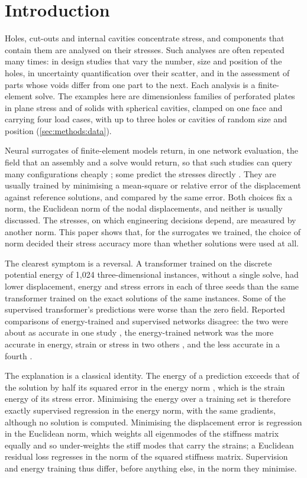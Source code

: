 \section{Introduction}\label{sec:intro}

Holes, cut-outs and internal cavities concentrate stress, and components that contain them are
analysed on their stresses. Such analyses are often repeated many times: in design studies
that vary the number, size and position of the holes, in uncertainty quantification over their
scatter, and in the assessment of parts whose voids differ from one part to the next. Each analysis
is a finite-element solve. The examples here are dimensionless families of perforated plates
in plane stress and of solids with spherical cavities, clamped on one face and carrying four
load cases, with up to three holes or cavities of random size and position
(\cref{sec:methods:data}).

Neural surrogates of finite-element models return, in one network evaluation, the field that
an assembly and a solve would return, so that such studies can query many configurations
cheaply
\cite{Pfaff2021,Lu2021DeepONet,Li2021FNO,He2024GeomDeepONet,Zeng2025PCNO,Liu2026GINOT,Deshpande2024MAgNET};
some predict the stresses directly \cite{JiangChen2023GNN}. They
are usually trained by minimising a mean-square or relative error of the displacement
against reference solutions, and compared by the same error. Both choices fix a norm, the
Euclidean norm of the nodal displacements, and neither is usually discussed. The stresses,
on which engineering decisions depend, are measured by another norm. This paper shows that,
for the surrogates we trained, the choice of norm decided their stress accuracy more than
whether solutions were used at all.

The clearest symptom is a reversal. A transformer trained on the discrete potential energy
of 1,024 three-dimensional instances, without a single solve, had lower displacement, energy
and stress errors in each of three seeds than the same transformer trained on the exact
solutions of the same instances. Some of the supervised transformer's predictions were worse
than the zero field.
Reported comparisons of energy-trained and supervised networks disagree: the two were about
as accurate in one study \cite{Zhu2019}, the energy-trained network was the more accurate in
energy, strain or stress in two others \cite{Dalton2023,MonteiroFernandes2025}, and the less
accurate in a fourth \cite{Sun2026FEVessel}.

The explanation is a classical identity. The energy of a prediction exceeds that of the
solution by half its squared error in the energy norm \cite{Ciarlet1978}, which is the
strain energy of its stress error. Minimising the energy over a training set is therefore
exactly supervised regression in the energy norm, with the same gradients, although no
solution is computed. Minimising the displacement error is regression in the Euclidean norm,
which weights all eigenmodes of the stiffness matrix equally and so under-weights the stiff
modes that carry the strains; a Euclidean residual loss regresses in the norm of the squared
stiffness matrix. Supervision and energy training thus differ, before anything else, in the
norm they minimise.

